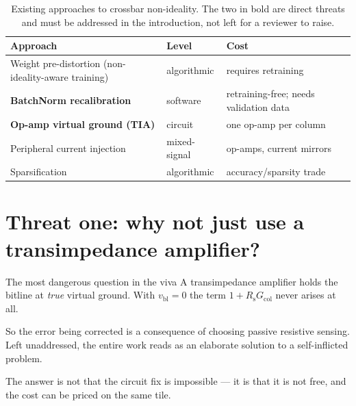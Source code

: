 \documentclass[11pt,a4paper]{report}
\newcommand{\Rs}{R_{\mathrm{s}}}
\newcommand{\Gcol}{G_{\mathrm{col}}}
\begin{document}
\begin{table}[h]
\centering
\caption{Existing approaches to crossbar non-ideality. The two in bold are
direct threats and must be addressed in the introduction, not left for a
reviewer to raise.}
\begin{tabular}{p{3.4cm}p{2.4cm}p{4.4cm}}
\toprule
Approach & Level & Cost \\
\midrule
Weight pre-distortion (non-ideality-aware training) & algorithmic & requires retraining \\
\textbf{BatchNorm recalibration} & software & retraining-free; needs validation data \\
\textbf{Op-amp virtual ground (TIA)} & circuit & one op-amp per column \\
Peripheral current injection & mixed-signal & op-amps, current mirrors \\
Sparsification & algorithmic & accuracy/sparsity trade \\
\bottomrule
\end{tabular}
\end{table}

\section{Threat one: why not just use a transimpedance amplifier?}

\begin{warnbox}{The most dangerous question in the viva}
A transimpedance amplifier holds the bitline at \emph{true} virtual ground.
With $v_{\mathrm{bl}} = 0$ the term $1 + \Rs\Gcol$ never arises at all.

So the error being corrected is a consequence of choosing passive resistive
sensing. Left unaddressed, the entire work reads as an elaborate solution to a
self-inflicted problem.
\end{warnbox}

The answer is not that the circuit fix is impossible --- it is that it is not
free, and the cost can be priced on the same tile.
\end{document}

